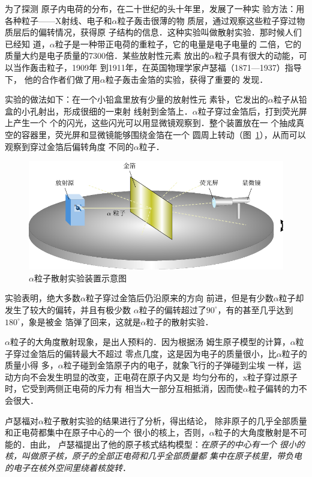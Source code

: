 为了探测
原子内电荷的分布，在二十世纪的头十年里，发展了一种实
验方法：用各种粒子——X射线、电子和$\alpha$粒子轰击很薄的物
质层，通过观察这些粒子穿过物质层后的偏转情况，获得原
子结构的信息．这种实验叫做散射实验．那时候人们已经知
道，$\alpha$粒子是一种带正电荷的重粒子，它的电量是电子电量的
二倍，它的质量大约是电子质量的7300倍．某些放射性元素
放出的$\alpha$粒子具有很大的动能，可以当作轰击粒子，1909年
到1911年，在英国物理学家卢瑟福（1871—1937）指导下，
他的合作者们做了用$\alpha$粒子轰击金箔的实验，获得了重要的
发现．

实验的做法如下：在一个小铅盒里放有少量的放射性元
素钋，它发出的$\alpha$粒子从铅盒的小孔射出，形成很细的一束射
线射到金箔上．$\alpha$粒子穿过金箔后，打到荧光屏上产生一个
个的闪光，这些闪光可以用显微镜观察到．整个装置放在一
个抽成真空的容器里，荧光屏和显微镜能够围绕金箔在一个
圆周上转动（图~\ref{fig_C_8-2}），从而可以观察到穿过金箔后偏转角度
不同的$\alpha$粒子．
\begin{figure}[htbp]
    \centering
    \includegraphics{fig/C/8-2.pdf}
    \caption{$\alpha$粒子散射实验装置示意图}\label{fig_C_8-2}
\end{figure}

实验表明，绝大多数$\alpha$粒子穿过金箔后仍沿原来的方向
前进，但是有少数$\alpha$粒子却发生了较大的偏转，并且有极少数
$\alpha$粒子的偏转超过了$90^{\circ}$，有的甚至几乎达到$180^{\circ}$，象是被金
箔弹了回来，这就是$\alpha$粒子的散射实验．

$\alpha$粒子的大角度散射现象，是出人预料的．因为根据汤
姆生原子模型的计算，$\alpha$粒子穿过金箔后的偏转最大不超过
零点几度，这是因为电子的质量很小，比$\alpha$粒子的质量小得
多，$\alpha$粒子碰到金箔原子内的电子，就象飞行的子弹碰到尘埃
一样，运动方向不会发生明显的改变，正电荷在原子内又是
均匀分布的，x粒子穿过原子时，它受到两侧正电荷的斥力有
相当大一部分互相抵消，因而使$\alpha$粒子偏转的力不会很大．

卢瑟福对$\alpha$粒子散射实验的结果进行了分析，得出结论，
除非原子的几乎全部质量和正电荷都集中在原子中心的一个
很小的核上，否则，$\alpha$粒子的大角度散射是不可能的．由此，
卢瑟福提出了他的原子核式结构模型：\textit{在原子的中心有一个
很小的核，叫做原子核，原子的全部正电荷和几乎全部质量都
集中在原子核里，带负电的电子在核外空间里绕着核旋转}．

